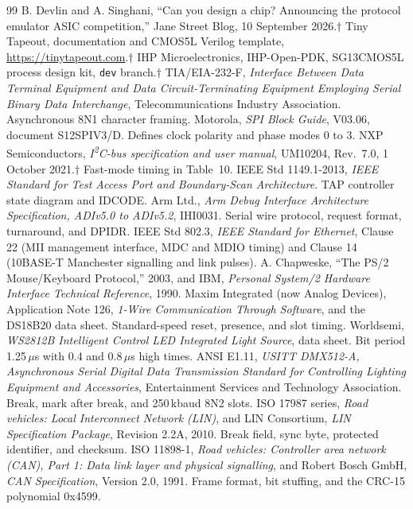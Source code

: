 \documentclass[11pt]{article}
\newcommand{\normalfill}{\setlength{\parfillskip}{0pt plus 1fil}}
\begin{document}
\normalfill
\begin{thebibliography}{99}
 B. Devlin and A. Singhani, ``Can you design a chip? Announcing the protocol emulator ASIC competition,'' Jane Street Blog, 10 September 2026.$\dagger$
 Tiny Tapeout, documentation and CMOS5L Verilog template, \url{https://tinytapeout.com}.$\dagger$
 IHP Microelectronics, IHP-Open-PDK, SG13CMOS5L process design kit, \texttt{dev} branch.$\dagger$
 TIA/EIA-232-F, \emph{Interface Between Data Terminal Equipment and Data Circuit-Terminating Equipment Employing Serial Binary Data Interchange}, Telecommunications Industry Association. Asynchronous 8N1 character framing.
 Motorola, \emph{SPI Block Guide}, V03.06, document S12SPIV3/D. Defines clock polarity and phase modes 0 to 3.
 NXP Semiconductors, \emph{I\textsuperscript{2}C-bus specification and user manual}, UM10204, Rev.~7.0, 1 October 2021.$\dagger$ Fast-mode timing in Table~10.
 IEEE Std 1149.1-2013, \emph{IEEE Standard for Test Access Port and Boundary-Scan Architecture}. TAP controller state diagram and IDCODE.
 Arm Ltd., \emph{Arm Debug Interface Architecture Specification, ADIv5.0 to ADIv5.2}, IHI0031. Serial wire protocol, request format, turnaround, and DPIDR.
 IEEE Std 802.3, \emph{IEEE Standard for Ethernet}, Clause 22 (MII management interface, MDC and MDIO timing) and Clause 14 (10BASE-T Manchester signalling and link pulses).
 A. Chapweske, ``The PS/2 Mouse/Keyboard Protocol,'' 2003, and IBM, \emph{Personal System/2 Hardware Interface Technical Reference}, 1990.
 Maxim Integrated (now Analog Devices), Application Note 126, \emph{1-Wire Communication Through Software}, and the DS18B20 data sheet. Standard-speed reset, presence, and slot timing.
 Worldsemi, \emph{WS2812B Intelligent Control LED Integrated Light Source}, data sheet. Bit period 1.25\,$\mu$s with 0.4 and 0.8\,$\mu$s high times.
 ANSI E1.11, \emph{USITT DMX512-A, Asynchronous Serial Digital Data Transmission Standard for Controlling Lighting Equipment and Accessories}, Entertainment Services and Technology Association. Break, mark after break, and 250\,kbaud 8N2 slots.
 ISO 17987 series, \emph{Road vehicles: Local Interconnect Network (LIN)}, and LIN Consortium, \emph{LIN Specification Package}, Revision 2.2A, 2010. Break field, sync byte, protected identifier, and checksum.
 ISO 11898-1, \emph{Road vehicles: Controller area network (CAN), Part 1: Data link layer and physical signalling}, and Robert Bosch GmbH, \emph{CAN Specification}, Version 2.0, 1991. Frame format, bit stuffing, and the CRC-15 polynomial 0x4599.

\end{thebibliography}
\end{document}
